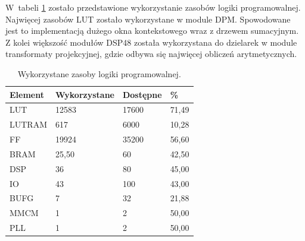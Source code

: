 W~tabeli \ref{tab:fpgautilization} zostało przedstawione wykorzystanie zasobów logiki programowalnej. Najwięcej zasobów LUT zostało wykorzystane w module DPM. Spowodowane jest to implementacją  dużego okna kontekstowego wraz z drzewem sumacyjnym. Z kolei większość modułów DSP48 została wykorzystana do dzielarek w module transformaty projekcyjnej, gdzie odbywa się najwięcej obliczeń arytmetycznych.
\begin{table}[]
\centering
\caption{Wykorzystane zasoby logiki programowalnej.}
\label{tab:fpgautilization}
\begin{tabular}{|l|l|l|l|}
\hline
Element & Wykorzystane & Dostępne & \% \\ \hline 
LUT & 12583 & 17600 & 71,49 \\ \hline
LUTRAM & 617 & 6000 & 10,28 \\ \hline
FF & 19924 & 35200 & 56,60 \\ \hline
BRAM & 25,50 & 60 & 42,50 \\ \hline
DSP & 36 & 80 & 45,00 \\ \hline
IO & 43 & 100 & 43,00 \\ \hline
BUFG & 7 & 32 & 21,88 \\ \hline
MMCM & 1 & 2 & 50,00 \\ \hline
PLL & 1 & 2 & 50,00 \\ \hline
\end{tabular}
\end{table}



